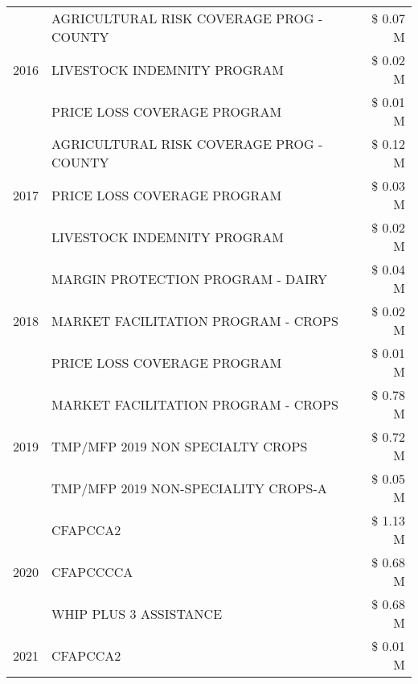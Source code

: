 \begin{tabular}{llr}
\cline{1-3}
\multirow[t]{3}{*}{2016} & AGRICULTURAL RISK COVERAGE PROG - COUNTY & \$ 0.07 M \\
 & LIVESTOCK INDEMNITY PROGRAM & \$ 0.02 M \\
 & PRICE LOSS COVERAGE PROGRAM & \$ 0.01 M \\
\cline{1-3}
\multirow[t]{3}{*}{2017} & AGRICULTURAL RISK COVERAGE PROG - COUNTY & \$ 0.12 M \\
 & PRICE LOSS COVERAGE PROGRAM & \$ 0.03 M \\
 & LIVESTOCK INDEMNITY PROGRAM & \$ 0.02 M \\
\cline{1-3}
\multirow[t]{3}{*}{2018} & MARGIN PROTECTION PROGRAM - DAIRY & \$ 0.04 M \\
 & MARKET FACILITATION PROGRAM - CROPS & \$ 0.02 M \\
 & PRICE LOSS COVERAGE PROGRAM & \$ 0.01 M \\
\cline{1-3}
\multirow[t]{3}{*}{2019} & MARKET FACILITATION PROGRAM - CROPS & \$ 0.78 M \\
 & TMP/MFP 2019 NON SPECIALTY CROPS & \$ 0.72 M \\
 & TMP/MFP 2019 NON-SPECIALITY CROPS-A & \$ 0.05 M \\
\cline{1-3}
\multirow[t]{3}{*}{2020} & CFAPCCA2 & \$ 1.13 M \\
 & CFAPCCCCA & \$ 0.68 M \\
 & WHIP PLUS 3 ASSISTANCE & \$ 0.68 M \\
\cline{1-3}
2021 & CFAPCCA2 & \$ 0.01 M \\
\cline{1-3}
\bottomrule
\end{tabular}
